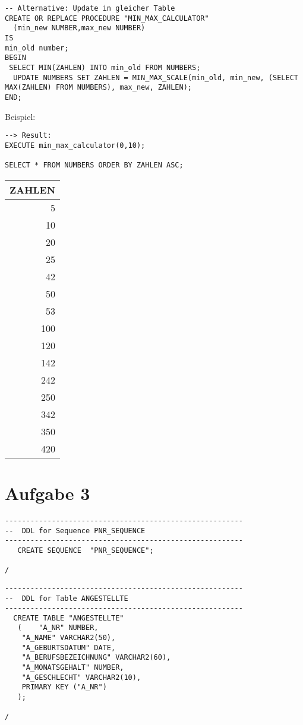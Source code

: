\documentclass{scrartcl}
\begin{document}
\begin{lstlisting}
-- Alternative: Update in gleicher Table
CREATE OR REPLACE PROCEDURE "MIN_MAX_CALCULATOR" 
  (min_new NUMBER,max_new NUMBER)
IS
min_old number;
BEGIN
 SELECT MIN(ZAHLEN) INTO min_old FROM NUMBERS;
  UPDATE NUMBERS SET ZAHLEN = MIN_MAX_SCALE(min_old, min_new, (SELECT MAX(ZAHLEN) FROM NUMBERS), max_new, ZAHLEN);
END;
\end{lstlisting}
Beispiel:
\begin{lstlisting}
--> Result: 
EXECUTE min_max_calculator(0,10);

SELECT * FROM NUMBERS ORDER BY ZAHLEN ASC;
\end{lstlisting}
\begin{tabular}{|r|}
\hline
 ZAHLEN \\
\hline
    5   \\
   10   \\
   20   \\
   25   \\
   42   \\
   50   \\
   53   \\
  100   \\
  120   \\
  142   \\
  242   \\
  250   \\
  342   \\
  350   \\
  420   \\
\hline
\end{tabular}

\newpage

\section*{Aufgabe 3}
\begin{lstlisting}
--------------------------------------------------------
--  DDL for Sequence PNR_SEQUENCE
--------------------------------------------------------
   CREATE SEQUENCE  "PNR_SEQUENCE";

/
\end{lstlisting}

\begin{lstlisting}
--------------------------------------------------------
--  DDL for Table ANGESTELLTE
--------------------------------------------------------
  CREATE TABLE "ANGESTELLTE" 
   (	"A_NR" NUMBER, 
	"A_NAME" VARCHAR2(50), 
	"A_GEBURTSDATUM" DATE, 
	"A_BERUFSBEZEICHNUNG" VARCHAR2(60), 
	"A_MONATSGEHALT" NUMBER, 
	"A_GESCHLECHT" VARCHAR2(10),
	PRIMARY KEY ("A_NR")
   );

/
\end{lstlisting}
\end{document}
